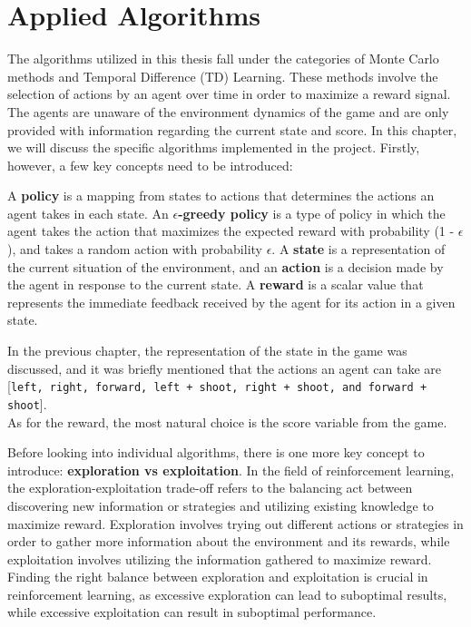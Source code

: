 \chapter{Applied Algorithms}
The algorithms utilized in this thesis fall under the categories of Monte Carlo methods and Temporal Difference (TD) Learning. These methods involve the selection of actions by an agent over time in order to maximize a reward signal. The agents are unaware of the environment dynamics of the game and are only provided with information regarding the current state and score. In this chapter, we will discuss the specific algorithms implemented in the project. Firstly, however, a few key concepts need to be introduced:

A \textbf{policy} is a mapping from states to actions that determines the actions an agent takes in each state. An \textbf{$\epsilon$-greedy policy} is a type of policy in which the agent takes the action that maximizes the expected reward with probability (1 - $\epsilon$), and takes a random action with probability $\epsilon$. A \textbf{state} is a representation of the current situation of the environment, and an \textbf{action} is a decision made by the agent in response to the current state. A \textbf{reward} is a scalar value that represents the immediate feedback received by the agent for its action in a given state.

In the previous chapter, the representation of the state in the game was discussed, and it was briefly mentioned that the actions an agent can take are [\texttt{left, right, forward, left + shoot, right + shoot, and forward + shoot}].\\ As for the reward, the most natural choice is the score variable from the game.

Before looking into individual algorithms, there is one more key concept to introduce: \textbf{exploration vs exploitation}. In the field of reinforcement learning, the exploration-exploitation trade-off refers to the balancing act between discovering new information or strategies and utilizing existing knowledge to maximize reward. Exploration involves trying out different actions or strategies in order to gather more information about the environment and its rewards, while exploitation involves utilizing the information gathered to maximize reward. Finding the right balance between exploration and exploitation is crucial in reinforcement learning, as excessive exploration can lead to suboptimal results, while excessive exploitation can result in suboptimal performance.

